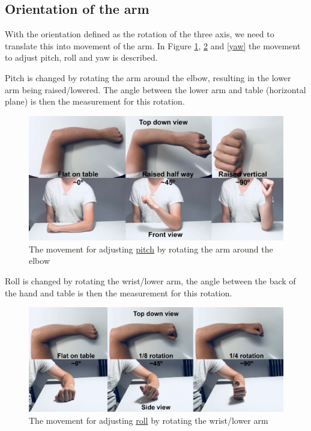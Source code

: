 \subsection{Orientation of the arm}
With the orientation defined as the rotation of the three axis, we need to translate this into movement of the arm. In Figure \ref{pitch}, \ref{roll} and \ref{yaw} the movement to adjust pitch, roll and yaw is described.

Pitch is changed by rotating the arm around the elbow, resulting in the lower arm being raised/lowered. The angle between the lower arm and table (horizontal plane) is then the measurement for this rotation.

\begin{figure}[h!]
    \centering
    \includegraphics[width=1\textwidth]{figures/pitch.png}
    \caption{The movement for adjusting \underline{pitch} by rotating the arm around the elbow}
    \label{pitch}
\end{figure}

Roll is changed by rotating the wrist/lower arm, the angle between the back of the hand and table is then the measurement for this rotation.

\begin{figure}[h!]
    \centering
    \includegraphics[width=1\textwidth]{figures/roll.png}
    \caption{The movement for adjusting \underline{roll} by rotating the wrist/lower arm}
    \label{roll}
\end{figure}

